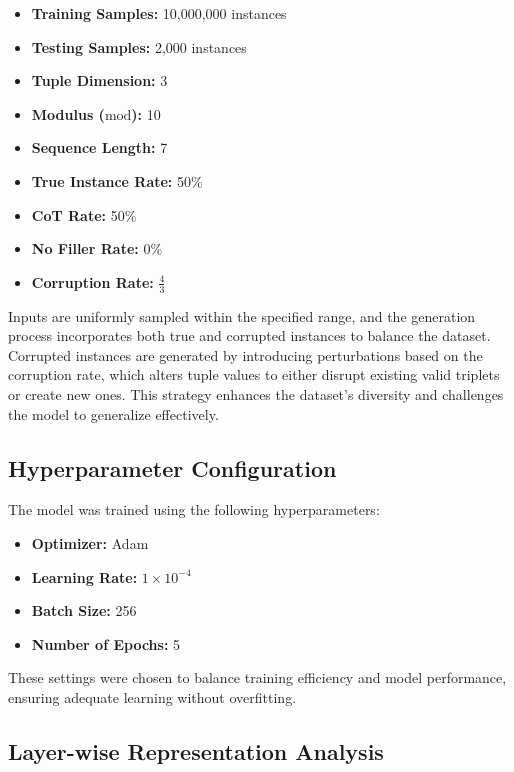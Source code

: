 \documentclass{article}
\begin{document}
\begin{itemize}
    \item \textbf{Training Samples:} 10,000,000 instances
    \item \textbf{Testing Samples:} 2,000 instances
    \item \textbf{Tuple Dimension:} 3
    \item \textbf{Modulus (\( \text{mod} \)):} 10
    \item \textbf{Sequence Length:} 7
    \item \textbf{True Instance Rate:} 50\%
    \item \textbf{CoT Rate:} 50\%
    \item \textbf{No Filler Rate:} 0\%
    \item \textbf{Corruption Rate:} \( \frac{4}{3} \)
\end{itemize}

Inputs are uniformly sampled within the specified range, and the generation process incorporates both true and corrupted instances to balance the dataset. Corrupted instances are generated by introducing perturbations based on the corruption rate, which alters tuple values to either disrupt existing valid triplets or create new ones. This strategy enhances the dataset's diversity and challenges the model to generalize effectively.

\subsection{Hyperparameter Configuration}

The model was trained using the following hyperparameters:

\begin{itemize}
    \item \textbf{Optimizer:} Adam
    \item \textbf{Learning Rate:} \(1 \times 10^{-4}\)
    \item \textbf{Batch Size:} 256
    \item \textbf{Number of Epochs:} 5
\end{itemize}

These settings were chosen to balance training efficiency and model performance, ensuring adequate learning without overfitting.

\subsection{Layer-wise Representation Analysis}
\end{document}

